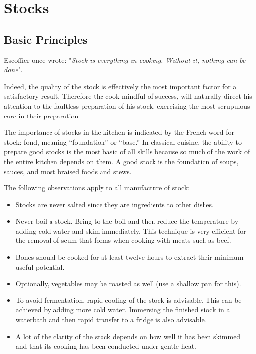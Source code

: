 \chapter{Stocks}
\minitoc

\section {Basic Principles} 

Escoffier once wrote: "\emph{Stock is everything in cooking.  Without it, nothing can be done}".  

Indeed, the quality of the stock is effectively the most important factor for a satisfactory result.  Therefore the cook mindful of success, will naturally direct his attention to the faultless preparation of his stock, exercising the most scrupulous care in their preparation.  

The importance of stocks in the kitchen is indicated by the French word for stock: fond, meaning “foundation” or “base.” In classical cuisine, the ability to prepare good stocks is the most basic of all skills because so much of the work of the entire kitchen depends on them. A good stock is the foundation of soups, sauces, and most braised foods and stews.

The following observations apply to all manufacture of stock:
\begin{itemize}
\item Stocks are never salted since they are ingredients to other dishes.
\item Never boil a stock.  Bring to the boil and then reduce the temperature by adding cold water and skim immediately.  This technique is very efficient for the removal of scum that forms when cooking with meats such as beef.
\item Bones should be cooked for at least twelve hours to extract their minimum useful potential.
\item Optionally, vegetables may be roasted as well (use a shallow pan for this).
\item To avoid fermentation, rapid cooling of the stock is advisable.  This can be achieved by adding more cold water.  Immersing the finished stock in a waterbath and then rapid transfer to a fridge is also advisable.
\item A lot of the clarity of the stock depends on how well it has been skimmed and that its cooking has been conducted under gentle heat. 
\end{itemize}  



